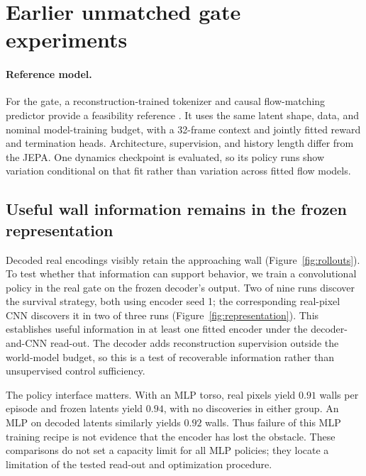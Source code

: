 \section{Earlier unmatched gate experiments}
\label{app:historical-gate}
\paragraph{Reference model.}
For the gate, a reconstruction-trained tokenizer and causal flow-matching predictor provide a
feasibility reference \citep{lipman2023flowmatching,chen2024diffusionforcing,hafner2025dreamer4}.
It uses the same latent shape, data, and nominal model-training budget, with a 32-frame context and
jointly fitted reward and termination heads. Architecture, supervision, and history length differ
from the JEPA. One dynamics checkpoint is evaluated, so its policy runs show variation conditional
on that fit rather than variation across fitted flow models.

\subsection{Useful wall information remains in the frozen representation}
\label{app:results-wall}

Decoded real encodings visibly retain the approaching wall (Figure~\ref{fig:rollouts}). To test
whether that information can support behavior, we train a convolutional policy in the real gate
on the frozen decoder's output. Two of nine runs discover the survival strategy, both using encoder
seed 1; the corresponding real-pixel CNN discovers it in two of three runs
(Figure~\ref{fig:representation}). This establishes useful information in at least one fitted encoder
under the decoder-and-CNN read-out. The decoder adds reconstruction supervision outside the
world-model budget, so this is a test of recoverable information rather than unsupervised control
sufficiency.

The policy interface matters. With an MLP torso, real pixels yield $0.91$ walls per episode and
frozen latents yield $0.94$, with no discoveries in either group. An MLP on decoded latents similarly
yields $0.92$ walls. Thus failure of this MLP training recipe is not evidence that the encoder has
lost the obstacle. These comparisons do not set a capacity limit for all MLP policies; they locate
a limitation of the tested read-out and optimization procedure.

